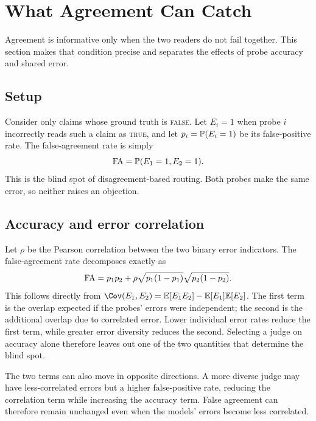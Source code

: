 \section{What Agreement Can Catch}
\label{sec:theory}

Agreement is informative only when the two readers do not fail together. This
section makes that condition precise and separates the effects of probe accuracy
and shared error.

\subsection{Setup}
\label{sec:theory:setup}

Consider only claims whose ground truth is \textsc{false}. Let $E_i=1$ when
probe $i$ incorrectly reads such a claim as \textsc{true}, and let
$p_i=\mathbb{P}(E_i=1)$ be its false-positive rate. The false-agreement rate is simply
\begin{equation}
  \mathrm{FA}=\mathbb{P}(E_1=1,E_2=1).
  \label{eq:fa}
\end{equation}
This is the blind spot of disagreement-based routing. Both probes make the same
error, so neither raises an objection.

\subsection{Accuracy and error correlation}
\label{sec:theory:identity}

Let $\rho$ be the Pearson correlation between the two binary error indicators.
The false-agreement rate decomposes exactly as
\begin{equation}
  \mathrm{FA}
  =p_1p_2
  +\rho\sqrt{p_1(1-p_1)}\sqrt{p_2(1-p_2)}.
  \label{eq:identity}
\end{equation}
This follows directly from
$\Cov(E_1,E_2)=\mathbb{E}[E_1E_2]-\mathbb{E}[E_1]\mathbb{E}[E_2]$.
The first term is the overlap expected if the probes' errors were independent;
the second is the additional overlap due to correlated error. Lower individual
error rates reduce the first term, while greater error diversity reduces the
second. Selecting a judge on accuracy alone therefore leaves out one of the two
quantities that determine the blind spot.

The two terms can also move in opposite directions. A more diverse judge may
have less-correlated errors but a higher false-positive rate, reducing the
correlation term while increasing the accuracy term. False agreement can
therefore remain unchanged even when the models' errors become less correlated.

